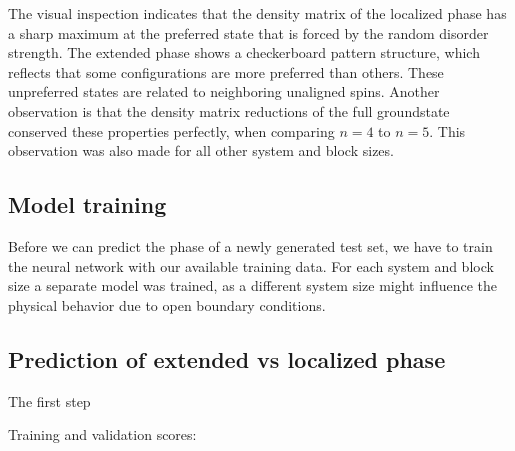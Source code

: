 \documentclass[reprint,amsmath,amssymb,aps,prb]{revtex4-2}
\begin{document}
\twocolumngrid
The visual inspection indicates that the density matrix of the localized phase has a sharp maximum at the preferred state that is forced by the random disorder strength. The extended phase shows a checkerboard pattern structure, which reflects that some configurations are more preferred than others. These unpreferred states are related to neighboring unaligned spins. Another observation is that the density matrix reductions of the full groundstate conserved these properties perfectly, when comparing $n=4$ to $n=5$. This observation was also made for all other system and block sizes.



\subsection{Model training}

Before we can predict the phase of a newly generated test set, we have to train the neural network with our available training data. For each system and block size a separate model was trained, as a different system size might influence the physical behavior due to open boundary conditions.

\subsection{Prediction of extended vs localized phase}

The first step

Training and validation scores:
\end{document}

